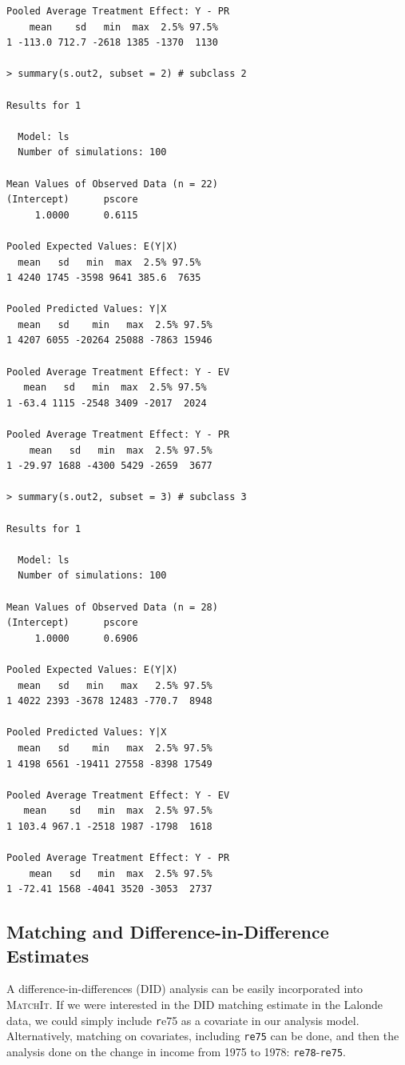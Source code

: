 \documentclass[oneside,letterpaper,titlepage]{article}
\newcommand{\MatchIt}{\textsc{MatchIt}}
\begin{document}
\begin{verbatim}
Pooled Average Treatment Effect: Y - PR
    mean    sd   min  max  2.5% 97.5%
1 -113.0 712.7 -2618 1385 -1370  1130

> summary(s.out2, subset = 2) # subclass 2

Results for 1 

  Model: ls 
  Number of simulations: 100 

Mean Values of Observed Data (n = 22) 
(Intercept)      pscore 
     1.0000      0.6115 

Pooled Expected Values: E(Y|X)
  mean   sd   min  max  2.5% 97.5%
1 4240 1745 -3598 9641 385.6  7635

Pooled Predicted Values: Y|X
  mean   sd    min   max  2.5% 97.5%
1 4207 6055 -20264 25088 -7863 15946

Pooled Average Treatment Effect: Y - EV
   mean   sd   min  max  2.5% 97.5%
1 -63.4 1115 -2548 3409 -2017  2024

Pooled Average Treatment Effect: Y - PR
    mean   sd   min  max  2.5% 97.5%
1 -29.97 1688 -4300 5429 -2659  3677

> summary(s.out2, subset = 3) # subclass 3

Results for 1 

  Model: ls 
  Number of simulations: 100 

Mean Values of Observed Data (n = 28) 
(Intercept)      pscore 
     1.0000      0.6906 

Pooled Expected Values: E(Y|X)
  mean   sd   min   max   2.5% 97.5%
1 4022 2393 -3678 12483 -770.7  8948

Pooled Predicted Values: Y|X
  mean   sd    min   max  2.5% 97.5%
1 4198 6561 -19411 27558 -8398 17549

Pooled Average Treatment Effect: Y - EV
   mean    sd   min  max  2.5% 97.5%
1 103.4 967.1 -2518 1987 -1798  1618

Pooled Average Treatment Effect: Y - PR
    mean   sd   min  max  2.5% 97.5%
1 -72.41 1568 -4041 3520 -3053  2737

\end{verbatim}

\subsection{Matching and Difference-in-Difference Estimates}
A difference-in-differences (DID) analysis can be easily incorporated into
\MatchIt.  If we were interested in the DID matching estimate in the
Lalonde data, we could simply include {\texttt re75} as a covariate in
our analysis model.  Alternatively, matching on covariates, including {\tt re75} can be done, 
and then the analysis done on the change in income from 1975 to 1978: {\tt re78}-{\tt re75}.  
\end{document}
